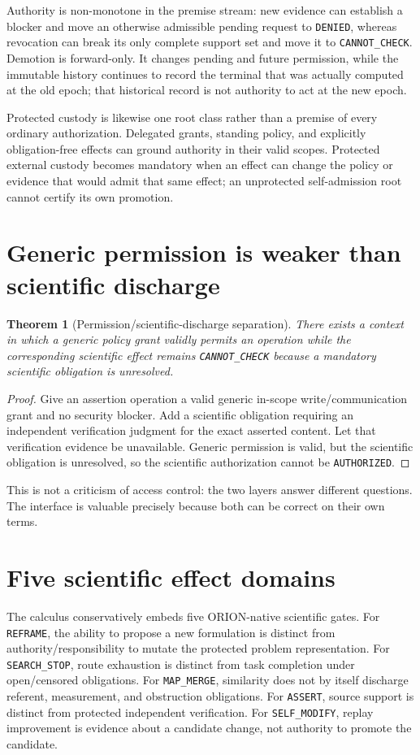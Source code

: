 \documentclass[11pt]{article}
\newtheorem{theorem}{Theorem}
\begin{document}
Authority is non-monotone in the premise stream: new evidence can establish a
blocker and move an otherwise admissible pending request to \texttt{DENIED},
whereas revocation can break its only complete support set and move it to
\texttt{CANNOT\_CHECK}. Demotion is forward-only. It changes pending and future
permission, while the immutable history continues to record the terminal that
was actually computed at the old epoch; that historical record is not authority
to act at the new epoch.

Protected custody is likewise one root class rather than a premise of every
ordinary authorization. Delegated grants, standing policy, and explicitly
obligation-free effects can ground authority in their valid scopes. Protected
external custody becomes mandatory when an effect can change the policy or
evidence that would admit that same effect; an unprotected self-admission root
cannot certify its own promotion.

\section{Generic permission is weaker than scientific discharge}
\begin{theorem}[Permission/scientific-discharge separation]
There exists a context in which a generic policy grant validly permits an operation while the corresponding scientific effect remains \texttt{CANNOT\_CHECK} because a mandatory scientific obligation is unresolved.
\end{theorem}
\begin{proof}
Give an assertion operation a valid generic in-scope write/communication grant and no security blocker. Add a scientific obligation requiring an independent verification judgment for the exact asserted content. Let that verification evidence be unavailable. Generic permission is valid, but the scientific obligation is unresolved, so the scientific authorization cannot be \texttt{AUTHORIZED}.
\end{proof}

This is not a criticism of access control: the two layers answer different questions. The interface is valuable precisely because both can be correct on their own terms.

\section{Five scientific effect domains}
The calculus conservatively embeds five ORION-native scientific gates. For \texttt{REFRAME}, the ability to propose a new formulation is distinct from authority/responsibility to mutate the protected problem representation. For \texttt{SEARCH\_STOP}, route exhaustion is distinct from task completion under open/censored obligations. For \texttt{MAP\_MERGE}, similarity does not by itself discharge referent, measurement, and obstruction obligations. For \texttt{ASSERT}, source support is distinct from protected independent verification. For \texttt{SELF\_MODIFY}, replay improvement is evidence about a candidate change, not authority to promote the candidate.
\end{document}
